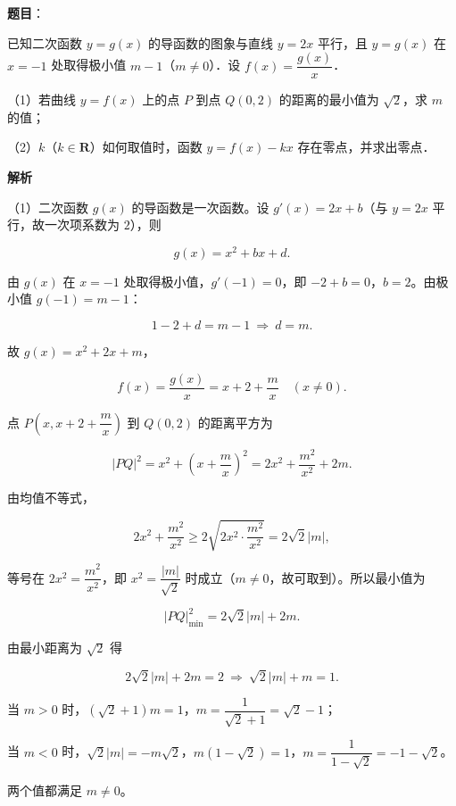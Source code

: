 \begin{answer}

\textbf{题目}：

已知二次函数 $y=g(x)$ 的导函数的图象与直线 $y=2x$ 平行，且 $y=g(x)$ 在 $x=-1$ 处取得极小值 $m-1$（$m\neq0$）．设 $f(x)=\dfrac{g(x)}{x}$．

（1）若曲线 $y=f(x)$ 上的点 $P$ 到点 $Q(0,2)$ 的距离的最小值为 $\sqrt2$，求 $m$ 的值；

（2）$k$（$k\in\mathbf R$）如何取值时，函数 $y=f(x)-kx$ 存在零点，并求出零点．

\textbf{解析}

（1）二次函数 $g(x)$ 的导函数是一次函数。设 $g'(x)=2x+b$（与 $y=2x$ 平行，故一次项系数为 $2$），则

\nopagebreak[4]
\[g(x)=x^2+bx+d.\]

由 $g(x)$ 在 $x=-1$ 处取得极小值，$g'(-1)=0$，即 $-2+b=0$，$b=2$。由极小值 $g(-1)=m-1$：

\nopagebreak[4]
\[1-2+d=m-1\ \Longrightarrow\ d=m.\]

故 $g(x)=x^2+2x+m$，

\nopagebreak[4]
\[f(x)=\frac{g(x)}{x}=x+2+\frac mx\quad(x\neq0).\]

点 $P\left(x,x+2+\dfrac mx\right)$ 到 $Q(0,2)$ 的距离平方为

\nopagebreak[4]
\[|PQ|^2=x^2+\left(x+\frac mx\right)^2=2x^2+\frac{m^2}{x^2}+2m.\]

由均值不等式，

\nopagebreak[4]
\[2x^2+\frac{m^2}{x^2}\geqslant2\sqrt{2x^2\cdot\frac{m^2}{x^2}}=2\sqrt2|m|,\]

等号在 $2x^2=\dfrac{m^2}{x^2}$，即 $x^2=\dfrac{|m|}{\sqrt2}$ 时成立（$m\neq0$，故可取到）。所以最小值为

\nopagebreak[4]
\[|PQ|_{\min}^2=2\sqrt2|m|+2m.\]

由最小距离为 $\sqrt2$ 得

\nopagebreak[4]
\[2\sqrt2|m|+2m=2\ \Longrightarrow\ \sqrt2|m|+m=1.\]

当 $m>0$ 时，$(\sqrt2+1)m=1$，$m=\dfrac{1}{\sqrt2+1}=\sqrt2-1$；

当 $m<0$ 时，$\sqrt2|m|=-m\sqrt2$，$m(1-\sqrt2)=1$，$m=\dfrac{1}{1-\sqrt2}=-1-\sqrt2$。

两个值都满足 $m\neq0$。


\end{answer}
